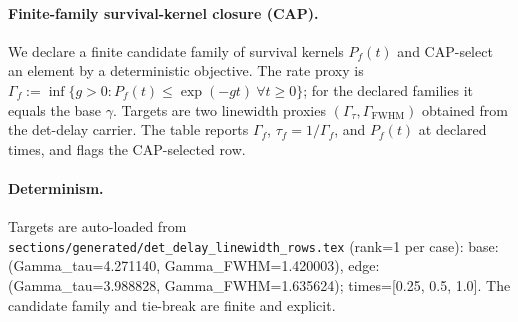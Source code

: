 \paragraph{Finite-family survival-kernel closure (CAP).} \AuditTag We declare a finite candidate family of survival kernels $P_f(t)$ and CAP-select an element by a deterministic objective. The rate proxy is $\Gamma_f:=\inf\{g>0: P_f(t)\le \exp(-g t)\ \forall t\ge 0\}$; for the declared families it equals the base $\gamma$. Targets are two linewidth proxies $(\Gamma_\tau,\Gamma_{\mathrm{FWHM}})$ obtained from the det-delay carrier. The table reports $\Gamma_f$, $\tau_f=1/\Gamma_f$, and $P_f(t)$ at declared times, and flags the CAP-selected row.
\paragraph{Determinism.} \AuditTag Targets are auto-loaded from \texttt{sections/generated/det\_delay\_linewidth\_rows.tex} (rank=1 per case): base: (Gamma\_tau=4.271140, Gamma\_FWHM=1.420003), edge: (Gamma\_tau=3.988828, Gamma\_FWHM=1.635624); times=[0.25, 0.5, 1.0]. The candidate family and tie-break are finite and explicit.